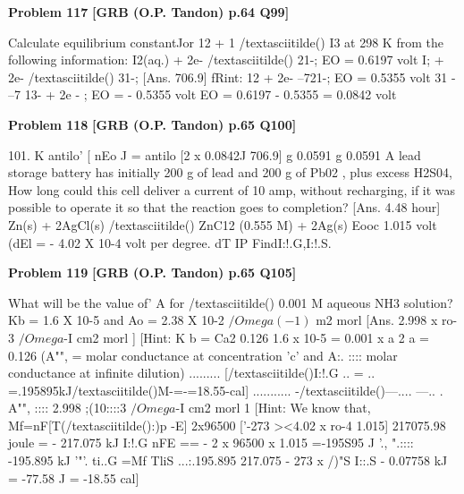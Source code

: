 \begin{problembox}
\textbf{Problem 117} \hfill \textbf{[GRB (O.P. Tandon) p.64 Q99]}
\label{q:ext-grb_all_questions-117}

Calculate equilibrium constantJor 
12 + 1 /textasciitilde() 
I3 
at 298 K from the following information: 
I2(aq.) + 2e- /textasciitilde() 
21-; 
EO = 0.6197 volt 
I; + 2e- /textasciitilde() 
31-; 
[Ans. 
706.9] 
fRint: 
12 + 2e- --721-; 
EO = 0.5355 volt 
31 - --7 13- + 2e - ; EO = - 0.5355 volt 
EO = 0.6197 - 0.5355 
= 0.0842 volt
\end{problembox}

\begin{problembox}
\textbf{Problem 118} \hfill \textbf{[GRB (O.P. Tandon) p.65 Q100]}
\label{q:ext-grb_all_questions-118}

101. 
K 
antilo' [ nEo J = antilo [2 x 0.0842J 
706.9] 
g 0.0591 
g 
0.0591 
A lead storage battery has initially 200 g of lead and 200 g of 
Pb02 , plus excess H2S04, How long could this cell deliver a 
current of 10 amp, without recharging, if it was possible to 
operate it so that the reaction goes to completion? 
[Ans. 
4.48 hour] 
Zn(s) + 2AgCl(s) /textasciitilde() 
ZnC12 (0.555 M) + 2Ag(s) 
Eooc 
1.015 volt (dEl = - 4.02 X 10-4 volt per degree. 
dT IP 
FindI:!.G,I:!.S.
\end{problembox}

\begin{problembox}
\textbf{Problem 119} \hfill \textbf{[GRB (O.P. Tandon) p.65 Q105]}
\label{q:ext-grb_all_questions-119}

What will be the value of' A for /textasciitilde() 0.001 M aqueous NH3 
solution? 
Kb = 1.6 X 10-5 and Ao = 2.38 X 10-2 $/Omega(-1)$ m2 morl 
[Ans. 
2.998 x ro-3 $/Omega$-I cm2 morl ] 
[Hint: 
K b = Ca2 
0.126 
1.6 x 10-5 = 0.001 x a 2 
a = 0.126 
(A"", = molar conductance 
at concentration 'c' and 
A:. :::: molar conductance at 
infinite dilution) 
\underline{\hspace{1cm}} ......... [/textasciitilde()I:!.G .. = .. =.195\underline{\hspace{1cm}}895\underline{\hspace{1cm}}kJ/textasciitilde()M-=-=18.55-cal] ........... -/textasciitilde()---.... ---.. . 
A"", :::: 2.998 ;(10::::3 $/Omega$-I cm2 morl 1 
[Hint: 
We know that, 
Mf=nF[T(/textasciitilde():)p -E] 
2x96500 ['-273 ><4.02 x ro-4 
1.015] 
217075.98 joule = - 217.075 kJ 
I:!.G 
nFE == - 2 x 96500 x 1.015 =-195S95 J 
'., ".:::: -195.895 kJ 
'"'. 
ti..G =Mf 
TliS 
...:.195.895 
217.075 - 273 x /)"S 
I::.S 
- 0.07758 kJ = -77.58 J = -18.55 cal]
\end{problembox}

